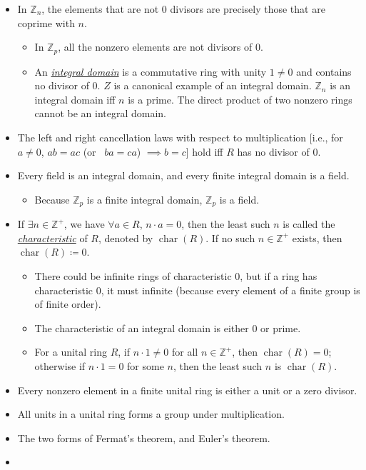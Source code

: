 \documentclass{article}
\newcommand{\df}[1]{\ul{\textit{#1}}}
\newcommand{\Z}{\mathbb{Z}}
\newcommand{\kar}{\operatorname{char}}
\begin{document}
\begin{itemize}
    \item In $\Z_n$, the elements that are not 0 divisors are precisely those that are coprime with $n$.
    \begin{itemize}
        \item In $\Z_p$, all the nonzero elements are not divisors of 0.
        \item An \df{integral domain} is a commutative ring with unity $1 \neq 0$ and contains no divisor of 0. $Z$ is a canonical example of an integral domain. $\Z_n$ is an integral domain iff $n$ is a prime. The direct product of two nonzero  rings cannot be an integral domain.
    \end{itemize}
    \item The left and right cancellation laws with respect to multiplication [i.e., for $a \neq 0$, $ab = ac$ (or \ $ba = ca$) $\implies b = c$] hold iff $R$ has no divisor of 0.
    \item Every field is an integral domain, and every finite integral domain is a field.
    \begin{itemize}
        \item Because $\Z_p$ is a finite integral domain, $\Z_p$ is a field.
    \end{itemize}
    \item If $\exists n \in \Z^+$, we have $\forall a \in R$, $n \cdot a = 0$, then the least such $n$ is called the \df{characteristic} of $R$, denoted by $\kar(R)$. If no such $n \in \Z^+$ exists, then $\kar(R) \coloneqq 0$.
    \begin{itemize}
        \item There could be infinite rings of characteristic 0, but if a ring has characteristic 0, it must infinite (because every element of a finite group is of finite order).
        \item The characteristic of an integral domain is either 0 or prime.
        \item For a unital ring $R$, if $n \cdot 1 \neq 0$ for all $n \in \Z^+$, then $\kar(R) = 0$; otherwise if $n \cdot 1 = 0$ for some $n$, then the least such $n$ is $\kar(R)$.
    \end{itemize}
    \item Every nonzero element in a finite unital ring is either a unit or a zero divisor.
    \item All units in a unital ring forms a group under multiplication.
    \item The two forms of Fermat's theorem, and Euler's theorem. 
    \item
    

\end{itemize}
\end{document}
